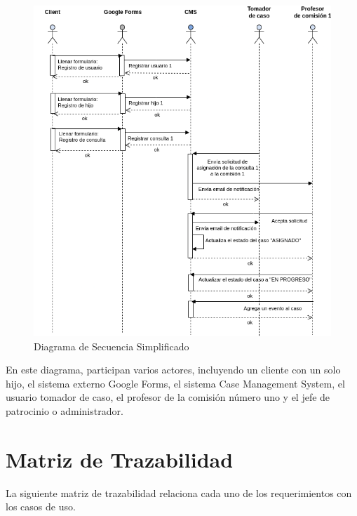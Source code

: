 \begin{figure}[H]
\centering
\includegraphics[width=1\linewidth]{fig/secuencia-basica.png}
\caption{Diagrama de Secuencia Simplificado}
\label{fig:secuencia-nominal}
\end{figure}
En este diagrama, participan varios actores, incluyendo un cliente con un solo hijo, el sistema externo Google Forms, el sistema Case Management System, el usuario tomador de caso, el profesor de la comisión número uno y el jefe de patrocinio o administrador.


\section{Matriz de Trazabilidad}
La siguiente matriz de trazabilidad relaciona cada uno de los requerimientos con los casos de uso.

